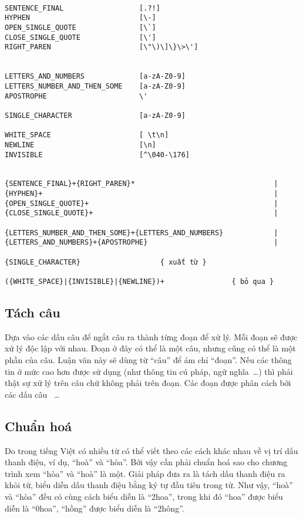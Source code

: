 \documentclass[a4paper,oneside]{book} %
\theoremstyle{break}
\begin{document}
\begin{verbatim}

SENTENCE_FINAL                  [.?!]
HYPHEN                          [\-]
OPEN_SINGLE_QUOTE               [\`]
CLOSE_SINGLE_QUOTE              [\']
RIGHT_PAREN                     [\"\)\]\}\>\']


LETTERS_AND_NUMBERS             [a-zA-Z0-9]
LETTERS_NUMBER_AND_THEN_SOME    [a-zA-Z0-9]
APOSTROPHE                      \'

SINGLE_CHARACTER                [a-zA-Z0-9]

WHITE_SPACE                     [ \t\n]
NEWLINE                         [\n]
INVISIBLE                       [^\040-\176]


{SENTENCE_FINAL}+{RIGHT_PAREN}*                                 |
{HYPHEN}+                                                       |
{OPEN_SINGLE_QUOTE}+                                            |
{CLOSE_SINGLE_QUOTE}+                                           |

{LETTERS_NUMBER_AND_THEN_SOME}+{LETTERS_AND_NUMBERS}            |
{LETTERS_AND_NUMBERS}+{APOSTROPHE}                              |

{SINGLE_CHARACTER}                   { xuất từ }

({WHITE_SPACE}|{INVISIBLE}|{NEWLINE})+                { bỏ qua }

\end{verbatim}


\subsection{Tách câu}

Dựa vào các dấu câu để ngắt câu ra thành từng đoạn để xử lý. Mỗi
đoạn sẽ được xử lý độc lập với nhau. Đoạn ở đây có thể là một câu,
nhưng cũng có thể là một 
phần của câu. Luận văn này sẽ dùng từ ``câu'' để ám chỉ ``đoạn''. Nếu
các thông tin ở mức cao hơn được sử dụng (như thông tin cú pháp, ngữ
nghĩa~\ldots) thì phải thật sự xử lý trên câu chứ không phải trên 
đoạn. Các đoạn được phân cách bởi các dấu câu  \fbox{,}
\fbox{;} \fbox{(} \fbox{)}~\ldots 

\subsection{Chuẩn hoá}

Do trong tiếng Việt có nhiều từ có thể viết theo các
cách khác nhau về vị trí dấu thanh điệu, ví dụ, ``hoà'' và
``hòa''. Bởi vậy cần phải chuẩn hoá sao cho chương trình xem ``hòa''
và ``hoà'' là một. Giải pháp đưa ra là tách dấu thanh điệu ra khỏi
từ, biểu diễn dấu thanh điệu bằng ký tự đầu tiên trong từ. Như vậy,
``hoà'' và ``hòa'' đều có cùng cách biểu diễn là ``2hoa'', trong khi
đó ``hoa'' được biểu diễn là ``0hoa'', ``hồng'' được biểu diễn là
``2hông''.
\end{document}
